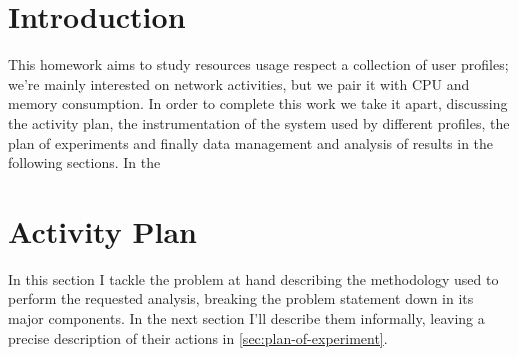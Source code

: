 \documentclass[10pt,a4paper]{article}
\begin{document}
    \title{\rmfamily\normalfont{}}
    \author{} \date{\today}
    
    \maketitle

    \begin{abstract}
      This short article collects the work I did in order to support
      my Quantitative Systems Analysis exam. The goal is to study
      resources usage respect a collection of user profiles, each of
      them catch a way of using some applications of interest in
      different time windows. I performed some experiments collecting
      results in a OLAP ``star''-like relational schema in order to
      provide summaries for dimensions under study, such as bandwidth
      usage, network activity, CPU and memory consumption.
    \end{abstract}
       
    \tableofcontents

    \newpage
   
    \section{Introduction}

    This homework aims to study resources usage respect a collection
    of user profiles; we're mainly interested on network activities,
    but we pair it with CPU and memory consumption. In order to
    complete this work we take it apart, discussing the activity plan,
    the instrumentation of the system used by different profiles, the
    plan of experiments and finally data management and analysis of
    results in the following sections. In the 
 
    \section{Activity Plan}
    In this section I tackle the problem at hand describing the
    methodology used to perform the requested analysis, breaking the
    problem statement down in its major components. In the next
    section I'll describe them informally, leaving a precise
    description of their actions in \autoref{sec:plan-of-experiment}.
\end{document}
